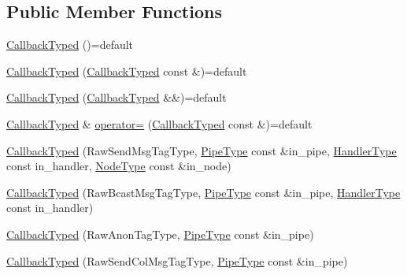 \subsection*{Public Member Functions}
\begin{DoxyCompactItemize}
\item 
\hyperlink{structvt_1_1pipe_1_1callback_1_1cbunion_1_1_callback_typed_aa4f66e11846b531708eb4c51eaca43fc}{Callback\+Typed} ()=default
\item 
\hyperlink{structvt_1_1pipe_1_1callback_1_1cbunion_1_1_callback_typed_a059f829db7b3d792e7ea78f1a2ce24ab}{Callback\+Typed} (\hyperlink{structvt_1_1pipe_1_1callback_1_1cbunion_1_1_callback_typed}{Callback\+Typed} const \&)=default
\item 
\hyperlink{structvt_1_1pipe_1_1callback_1_1cbunion_1_1_callback_typed_afc499cbc15b193928e02f5ed5c4a98ca}{Callback\+Typed} (\hyperlink{structvt_1_1pipe_1_1callback_1_1cbunion_1_1_callback_typed}{Callback\+Typed} \&\&)=default
\item 
\hyperlink{structvt_1_1pipe_1_1callback_1_1cbunion_1_1_callback_typed}{Callback\+Typed} \& \hyperlink{structvt_1_1pipe_1_1callback_1_1cbunion_1_1_callback_typed_a001cf806e3cd6fec3e07bb698901bacd}{operator=} (\hyperlink{structvt_1_1pipe_1_1callback_1_1cbunion_1_1_callback_typed}{Callback\+Typed} const \&)=default
\item 
\hyperlink{structvt_1_1pipe_1_1callback_1_1cbunion_1_1_callback_typed_a6ada0c9d4dc45befd884f0855ee39c73}{Callback\+Typed} (Raw\+Send\+Msg\+Tag\+Type, \hyperlink{namespacevt_ac9852acda74d1896f48f406cd72c7bd3}{Pipe\+Type} const \&in\+\_\+pipe, \hyperlink{namespacevt_af64846b57dfcaf104da3ef6967917573}{Handler\+Type} const in\+\_\+handler, \hyperlink{namespacevt_a866da9d0efc19c0a1ce79e9e492f47e2}{Node\+Type} const \&in\+\_\+node)
\item 
\hyperlink{structvt_1_1pipe_1_1callback_1_1cbunion_1_1_callback_typed_a3be7346f2a8c92263f838c30c92ec011}{Callback\+Typed} (Raw\+Bcast\+Msg\+Tag\+Type, \hyperlink{namespacevt_ac9852acda74d1896f48f406cd72c7bd3}{Pipe\+Type} const \&in\+\_\+pipe, \hyperlink{namespacevt_af64846b57dfcaf104da3ef6967917573}{Handler\+Type} const in\+\_\+handler)
\item 
\hyperlink{structvt_1_1pipe_1_1callback_1_1cbunion_1_1_callback_typed_ac017bd9d99b889d882acb7e9847d0378}{Callback\+Typed} (Raw\+Anon\+Tag\+Type, \hyperlink{namespacevt_ac9852acda74d1896f48f406cd72c7bd3}{Pipe\+Type} const \&in\+\_\+pipe)
\item 
\hyperlink{structvt_1_1pipe_1_1callback_1_1cbunion_1_1_callback_typed_ad455eeb861c8abf6bfba2267dd389a7c}{Callback\+Typed} (Raw\+Send\+Col\+Msg\+Tag\+Type, \hyperlink{namespacevt_ac9852acda74d1896f48f406cd72c7bd3}{Pipe\+Type} const \&in\+\_\+pipe)

\end{DoxyCompactItemize}

